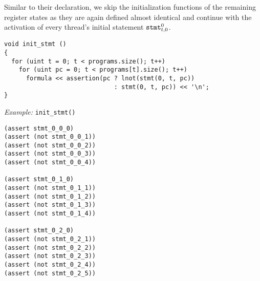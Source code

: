 \noindent
Similar to their declaration, we skip the initialization functions of the remaining register states as they are again defined almost identical and continue with the activation of every thread's initial statement $\texttt{stmt}^0_{t, 0}$.
\begin{lstlisting}[style=c++]
void init_stmt ()
{
  for (uint t = 0; t < programs.size(); t++)
    for (uint pc = 0; t < programs[t].size(); t++)
      formula << assertion(pc ? lnot(stmt(0, t, pc))
                              : stmt(0, t, pc)) << '\n';
}
\end{lstlisting}

\noindent
\emph{Example:} \lstinline[style=c++]{init_stmt()}

\begin{lstlisting}[language=SMTLib]
(assert stmt_0_0_0)
(assert (not stmt_0_0_1))
(assert (not stmt_0_0_2))
(assert (not stmt_0_0_3))
(assert (not stmt_0_0_4))

(assert stmt_0_1_0)
(assert (not stmt_0_1_1))
(assert (not stmt_0_1_2))
(assert (not stmt_0_1_3))
(assert (not stmt_0_1_4))

(assert stmt_0_2_0)
(assert (not stmt_0_2_1))
(assert (not stmt_0_2_2))
(assert (not stmt_0_2_3))
(assert (not stmt_0_2_4))
(assert (not stmt_0_2_5))
\end{lstlisting}

